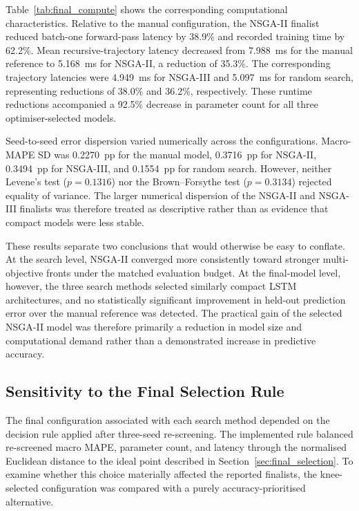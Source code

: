 \documentclass[a4paper,fleqn]{cas-sc}
\begin{document}
Table~\ref{tab:final_compute} shows the corresponding computational characteristics. Relative to the manual configuration, the NSGA-II finalist reduced batch-one forward-pass latency by 38.9\% and recorded training time by 62.2\%. Mean recursive-trajectory latency decreased from 7.988~ms for the manual reference to 5.168~ms for NSGA-II, a reduction of 35.3\%. The corresponding trajectory latencies were 4.949~ms for NSGA-III and 5.097~ms for random search, representing reductions of 38.0\% and 36.2\%, respectively. These runtime reductions accompanied a 92.5\% decrease in parameter count for all three optimiser-selected models.

Seed-to-seed error dispersion varied numerically across the configurations. Macro-MAPE SD was 0.2270~pp for the manual model, 0.3716~pp for NSGA-II, 0.3494~pp for NSGA-III, and 0.1554~pp for random search. However, neither Levene's test ($p=0.1316$) nor the Brown--Forsythe test ($p=0.3134$) rejected equality of variance. The larger numerical dispersion of the NSGA-II and NSGA-III finalists was therefore treated as descriptive rather than as evidence that compact models were less stable.

These results separate two conclusions that would otherwise be easy to conflate. At the search level, NSGA-II converged more consistently toward stronger multi-objective fronts under the matched evaluation budget. At the final-model level, however, the three search methods selected similarly compact LSTM architectures, and no statistically significant improvement in held-out prediction error over the manual reference was detected. The practical gain of the selected NSGA-II model was therefore primarily a reduction in model size and computational demand rather than a demonstrated increase in predictive accuracy.


\subsection{Sensitivity to the Final Selection Rule}
\label{sec:selection_sensitivity}

The final configuration associated with each search method depended on the decision rule applied after three-seed re-screening. The implemented rule balanced re-screened macro MAPE, parameter count, and latency through the normalised Euclidean distance to the ideal point described in Section~\ref{sec:final_selection}. To examine whether this choice materially affected the reported finalists, the knee-selected configuration was compared with a purely accuracy-prioritised alternative.
\end{document}

